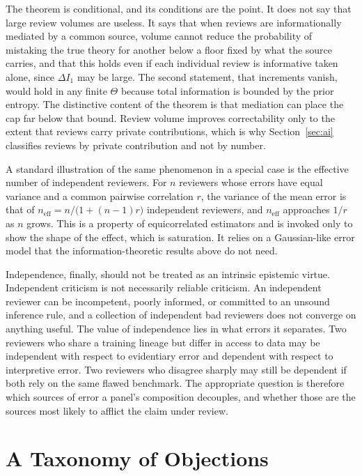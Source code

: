 \documentclass[11pt]{article}
\theoremstyle{remark}
\begin{document}
The theorem is conditional, and its conditions are the point. It does not say that large review volumes are useless. It says that when reviews are informationally mediated by a common source, volume cannot reduce the probability of mistaking the true theory for another below a floor fixed by what the source carries, and that this holds even if each individual review is informative taken alone, since $\Delta I_1$ may be large. The second statement, that increments vanish, would hold in any finite $\Theta$ because total information is bounded by the prior entropy. The distinctive content of the theorem is that mediation can place the cap far below that bound. Review volume improves correctability only to the extent that reviews carry private contributions, which is why Section~\ref{sec:ai} classifies reviews by private contribution and not by number.

A standard illustration of the same phenomenon in a special case is the effective number of independent reviewers. For $n$ reviewers whose errors have equal variance and a common pairwise correlation $r$, the variance of the mean error is that of $n_{\mathrm{eff}}=n/\bigl(1+(n-1)r\bigr)$ independent reviewers, and $n_{\mathrm{eff}}$ approaches $1/r$ as $n$ grows. This is a property of equicorrelated estimators and is invoked only to show the shape of the effect, which is saturation. It relies on a Gaussian-like error model that the information-theoretic results above do not need.

Independence, finally, should not be treated as an intrinsic epistemic virtue. Independent criticism is not necessarily reliable criticism. An independent reviewer can be incompetent, poorly informed, or committed to an unsound inference rule, and a collection of independent bad reviewers does not converge on anything useful. The value of independence lies in what errors it separates. Two reviewers who share a training lineage but differ in access to data may be independent with respect to evidentiary error and dependent with respect to interpretive error. Two reviewers who disagree sharply may still be dependent if both rely on the same flawed benchmark. The appropriate question is therefore which sources of error a panel's composition decouples, and whether those are the sources most likely to afflict the claim under review.

\section{A Taxonomy of Objections}
\end{document}
